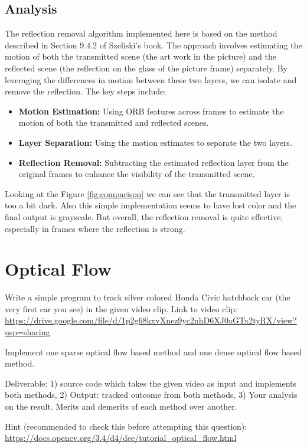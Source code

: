 \documentclass[12pt,a4paper]{article}
\begin{document}
\subsection{Analysis}
The reflection removal algorithm implemented here is based on the method described in Section 9.4.2 of Szeliski's book. The approach involves estimating the motion of both the 
transmitted scene (the art work in the picture) and the reflected scene (the reflection on the glass of the picture frame) separately. By leveraging the differences in motion between 
these two layers, we can isolate and remove the reflection. The key steps include:
\begin{itemize}
    \item \textbf{Motion Estimation:} Using ORB features across frames to estimate the motion of both the transmitted and reflected scenes.
    \item \textbf{Layer Separation:} Using the motion estimates to separate the two layers.
    \item \textbf{Reflection Removal:} Subtracting the estimated reflection layer from the original frames to enhance the visibility of the transmitted scene.
\end{itemize}

Looking at the Figure \ref{fig:comparison} we can see that the transmitted layer is too a bit dark. Also this simple implementation seems to have lost color and the final output is 
grayscale. But overall, the reflection removal is quite effective, especially in frames where the reflection is strong.


\section{Optical Flow}
Write a simple program to track silver colored Honda Civic hatchback car (the very first car you see) in the given video clip. 
Link to video clip: \url{https://drive.google.com/file/d/1p2g68kxvXnez9yc2nhD6XJ0aGTx2tyRX/view?usp=sharing}

Implement one sparse optical flow based method and one dense optical flow based method.

Deliverable: 1) source code which takes the given video as input and implements both methods, 2) Output: tracked outcome from both methods, 
3) Your analysis on the result. Merits and demerits of each method over another.

Hint (recommended to check this before attempting this question): \url{https://docs.opencv.org/3.4/d4/dee/tutorial_optical_flow.html}
\end{document}
